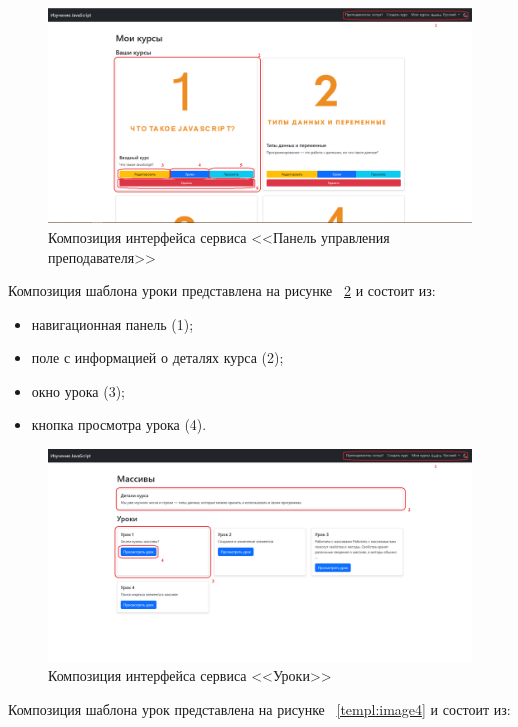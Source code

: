 \begin{figure}[h]
	\centering
	\includegraphics[width=1\linewidth]{images/учитель}
	\caption{Композиция интерфейса сервиса <<Панель управления преподавателя>>}
	\label{templ:image2}
\end{figure}
 

Композиция шаблона уроки представлена на рисунке ~\ref{templ:image3} и состоит из:

\begin{itemize}
	\item навигационная панель (1);
	\item поле с информацией о деталях курса (2);
	\item окно урока (3);
	\item кнопка просмотра урока (4).
\end{itemize}

\begin{figure}[h]
	\centering
	\includegraphics[width=1\linewidth]{images/уроки}
	\caption{Композиция интерфейса сервиса <<Уроки>>}
	\label{templ:image3}
\end{figure}

Композиция шаблона урок представлена на рисунке ~\ref{templ:image4} и состоит из:

